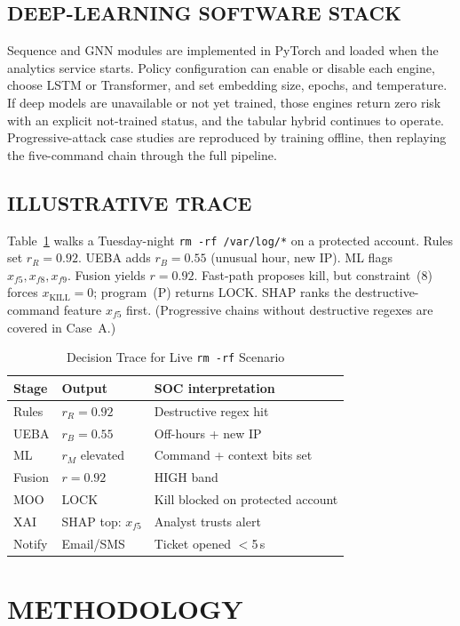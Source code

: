 \documentclass{ieeeaccess}
\begin{document}
\subsection{DEEP-LEARNING SOFTWARE STACK}
Sequence and GNN modules are implemented in PyTorch and loaded when the analytics service starts. Policy configuration can enable or disable each engine, choose LSTM or Transformer, and set embedding size, epochs, and temperature. If deep models are unavailable or not yet trained, those engines return zero risk with an explicit not-trained status, and the tabular hybrid continues to operate. Progressive-attack case studies are reproduced by training offline, then replaying the five-command chain through the full pipeline.

\subsection{ILLUSTRATIVE TRACE}
Table~\ref{tab:case-study} walks a Tuesday-night \texttt{rm -rf /var/log/*} on a protected account. Rules set $r_R=0.92$. UEBA adds $r_B=0.55$ (unusual hour, new IP). ML flags $x_{f5},x_{f8},x_{f9}$. Fusion yields $r=0.92$. Fast-path proposes kill, but constraint~(8) forces $x_{\mathrm{KILL}}=0$; program~(P) returns LOCK. SHAP ranks the destructive-command feature $x_{f5}$ first. (Progressive chains without destructive regexes are covered in Case~A.)

\begin{table}[!t]
\caption{Decision Trace for Live \texttt{rm -rf} Scenario}
\label{tab:case-study}
\centering
\footnotesize
\begin{tabular}{lll}
\toprule
\textbf{Stage} & \textbf{Output} & \textbf{SOC interpretation} \\
\midrule
Rules & $r_R{=}0.92$ & Destructive regex hit \\
UEBA & $r_B{=}0.55$ & Off-hours + new IP \\
ML & $r_M$ elevated & Command + context bits set \\
Fusion & $r{=}0.92$ & HIGH band \\
MOO & LOCK & Kill blocked on protected account \\
XAI & SHAP top: $x_{f5}$ & Analyst trusts alert \\
Notify & Email/SMS & Ticket opened $<$5\,s \\
\bottomrule
\end{tabular}
\end{table}

\section{METHODOLOGY}
\label{sec:method}
\end{document}
